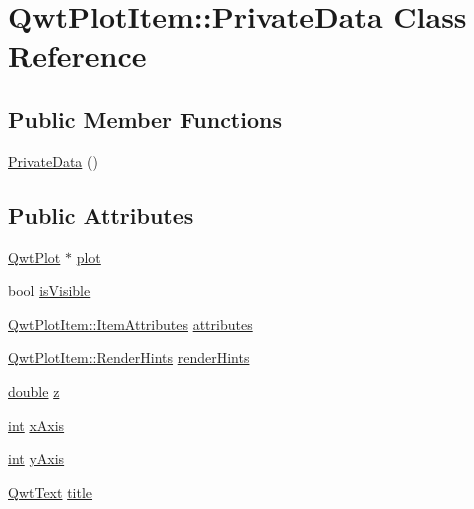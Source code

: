 \hypertarget{class_qwt_plot_item_1_1_private_data}{\section{Qwt\-Plot\-Item\-:\-:Private\-Data Class Reference}
\label{class_qwt_plot_item_1_1_private_data}
}
\subsection*{Public Member Functions}
\begin{DoxyCompactItemize}
\item 
\hyperlink{class_qwt_plot_item_1_1_private_data_ab740736ff11464a6affb6e95b84f8ea2}{Private\-Data} ()
\end{DoxyCompactItemize}
\subsection*{Public Attributes}
\begin{DoxyCompactItemize}
\item 
\hyperlink{class_qwt_plot}{Qwt\-Plot} $\ast$ \hyperlink{class_qwt_plot_item_1_1_private_data_acf5a6680637a7a753aa716bc66d80805}{plot}
\item 
bool \hyperlink{class_qwt_plot_item_1_1_private_data_a58508a7fa9ccabf100dadbbfab9ce788}{is\-Visible}
\item 
\hyperlink{class_qwt_plot_item_af356dc13c7838c7437334e199a356764}{Qwt\-Plot\-Item\-::\-Item\-Attributes} \hyperlink{class_qwt_plot_item_1_1_private_data_aff9e4bba758cf25763bc00740d8c1357}{attributes}
\item 
\hyperlink{class_qwt_plot_item_a40cf900701d3a68948b00316689616d1}{Qwt\-Plot\-Item\-::\-Render\-Hints} \hyperlink{class_qwt_plot_item_1_1_private_data_aacfde963a6b51e16de9eabd26164bc9d}{render\-Hints}
\item 
\hyperlink{_super_l_u_support_8h_a8956b2b9f49bf918deed98379d159ca7}{double} \hyperlink{class_qwt_plot_item_1_1_private_data_a65da18c22bd4ccc2c5eedf4bbc8b57dc}{z}
\item 
\hyperlink{ioapi_8h_a787fa3cf048117ba7123753c1e74fcd6}{int} \hyperlink{class_qwt_plot_item_1_1_private_data_a68ccdb96a8badd93f84502901bfce02e}{x\-Axis}
\item 
\hyperlink{ioapi_8h_a787fa3cf048117ba7123753c1e74fcd6}{int} \hyperlink{class_qwt_plot_item_1_1_private_data_ac7c87771570f493ac963b211bf46646c}{y\-Axis}
\item 
\hyperlink{class_qwt_text}{Qwt\-Text} \hyperlink{class_qwt_plot_item_1_1_private_data_a61ca8402f2302171eba54e81382bb7c9}{title}
\end{DoxyCompactItemize}


